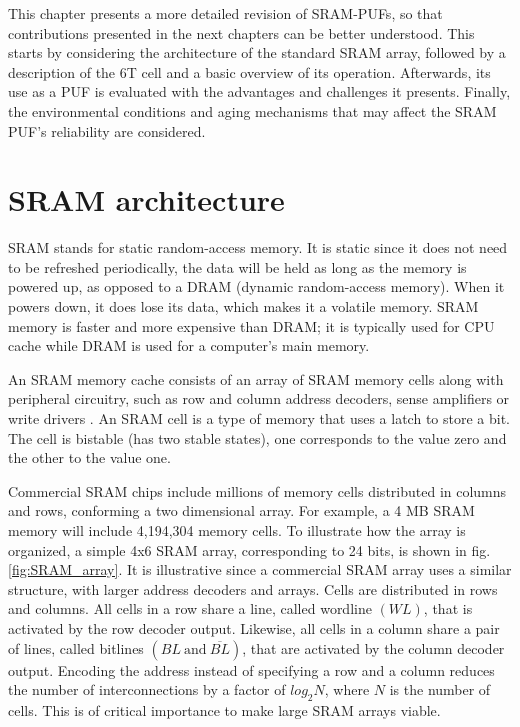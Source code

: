 \label{chap:3}


This chapter presents a more detailed revision of SRAM-PUFs, so that contributions presented in the next chapters can be better understood. This starts by considering the architecture of the standard SRAM array, followed by a description of the 6T cell and a basic overview of its operation. Afterwards, its use as a PUF is evaluated with the advantages and challenges it presents. Finally, the environmental conditions and aging mechanisms that may affect the SRAM PUF's reliability are considered. 

\section{SRAM architecture}

SRAM stands for static random-access memory. It is static since it does not need to be refreshed periodically, the data will be held as long as the memory is powered up, as opposed to a DRAM (dynamic random-access memory). When it powers down, it does lose its data, which makes it a volatile memory. SRAM memory is faster and more expensive than DRAM; it is typically used for CPU cache while DRAM is used for a computer's main memory.

An SRAM memory cache consists of an array of SRAM memory cells along with peripheral circuitry, such as row and column address decoders, sense amplifiers or write drivers \cite{Singh2013}. An SRAM cell is a type of memory that uses a latch to store a bit. The cell is bistable (has two stable states), one corresponds to the value zero and the other to the value one.

Commercial SRAM chips include millions of memory cells distributed in columns and rows, conforming a two dimensional array. For example, a 4 MB SRAM memory will include 4,194,304 memory cells. To illustrate how the array is organized, a simple 4x6 SRAM array, corresponding to 24 bits, is shown in fig. \ref{fig:SRAM_array}. It is illustrative since a commercial SRAM array uses a similar structure, with larger address decoders and arrays. Cells are distributed in rows and columns. All cells in a row share a line, called wordline $(WL)$, that is activated by the row decoder output. Likewise, all cells in a column share a pair of lines, called bitlines $(BL \ \mathrm{ and } \ \overline{BL})$, that are activated by the column decoder output. Encoding the address instead of specifying a row and a column reduces the number of interconnections by a factor of $log_2N$, where $N$ is the number of cells. This is of critical importance to make large SRAM arrays viable.  


